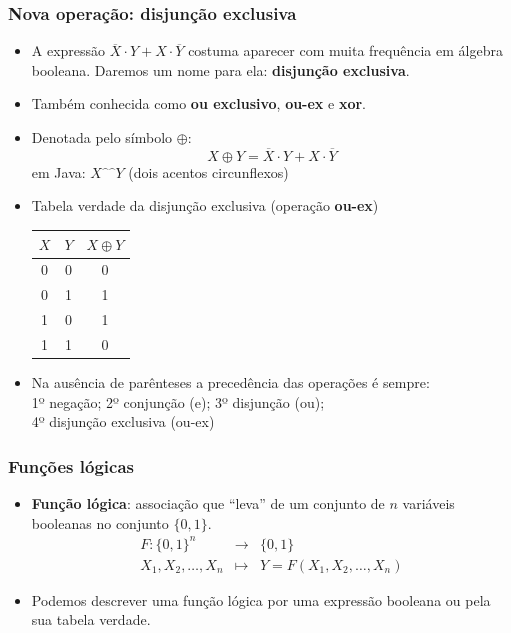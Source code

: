 \documentclass{beamer}
\begin{document}
\begin{frame}
 \frametitle{Nova operação: disjunção exclusiva}

\begin{itemize}
 \item A expressão $\overline{X} \cdot Y + X \cdot \overline{Y}$ costuma
aparecer com muita frequência em álgebra booleana. Daremos um nome para ela:
\textbf{disjunção exclusiva}.
 \pause
 \item Também conhecida como \textbf{ou exclusivo}, \textbf{ou-ex} e
\textbf{xor}.
\pause
 \item Denotada pelo símbolo $\oplus$:\\[-6pt]
  $$X \oplus Y = \overline{X} \cdot Y + X \cdot \overline{Y}$$
\vspace{-12pt}
 em Java: $X \hat{\phantom{o}}\hat{\phantom{o}} Y$ (dois acentos
circunflexos)\\[12pt]
\pause
 \item Tabela verdade da disjunção exclusiva (operação \textbf{ou-ex})\\
\begin{center}
\begin{tabular}{cc|c}
 $X$ & $Y$ & $X \oplus Y$ \\
\hline
 0 & 0 & 0 \\
 0 & 1 & 1 \\
 1 & 0 & 1 \\
 1 & 1 & 0 \\
\end{tabular}
\end{center}

 \pause
\item Na ausência de parênteses a precedência das operações é sempre:\\
1º negação; \;\; \pause 2º conjunção (e); \;\;
\pause 3º disjunção (ou); \pause \\ 4º disjunção exclusiva (ou-ex)

\end{itemize}

\end{frame}


\begin{frame}
 \frametitle{Funções lógicas}

\begin{itemize}
 \item \textbf{Função lógica}: associação que ``leva'' de um conjunto de $n$
variáveis booleanas no conjunto $\{0,1\}$.\\[-18pt]
\begin{eqnarray*}
F : \{0,1\}^n & \rightarrow & \{0,1\} \\
   X_1, X_2, \ldots, X_n & \mapsto & Y = F(X_1, X_2, \ldots, X_n)
\end{eqnarray*}

\vspace{-6pt}
\pause
\item Podemos descrever uma função lógica por uma expressão booleana ou pela
sua tabela verdade.
\end{itemize}


\end{frame}
\end{document}
